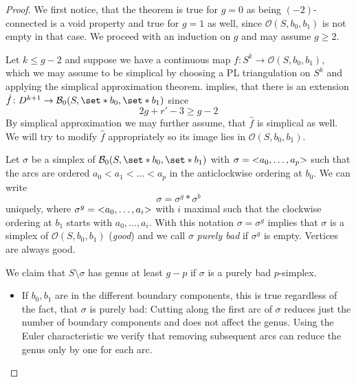 \connectivity*
\begin{proof}
	We first notice, that the theorem is true for $g=0$ as being $(-2)$-connected is a void property and true for $g=1$ as well, since $\mathcal{O}(S,b_0,b_1)$ is not empty in that case.
	We proceed with an induction on $g$ and may assume $g\ge 2$.
	
	Let $k \le g-2$ and suppose we have a continuous map $f \colon S^k \to \mathcal{O}(S,b_0,b_1)$, which we may assume to be simplical by choosing a PL triangulation on $S^k$ and applying the simplical approximation theorem.
	 implies, that there is an extension $\hat{f} \colon D^{k+1} \to \mathcal{B}_0(S,\set*{b_0},\set*{b_1})$ since 
	\[
		2g + r' -3 \ge g-2
	\]
	By simplical approximation we may further assume, that $\hat{f}$ is simplical as well.
	We will try to modify $\hat{f}$ appropriately so its image lies in $\mathcal{O}(S,b_0,b_1)$.
	
	Let $\sigma$ be a simplex of $\mathcal{B}_0(S,\set*{b_0},\set*{b_1})$ with $\sigma = \lenbrace{a_0, \ldots , a_p}$ such that the arcs are ordered $a_0 < a_1 < \ldots < a_p$ in the anticlockwise ordering at $b_0$.
	We can write 
	\[
		\sigma = \sigma^g * \sigma^b
	\]
	uniquely, where $\sigma^g = \lenbrace{a_0, \ldots ,a_i}$ with $i$ maximal such that the clockwise ordering at $b_1$ starts with $a_0, \ldots , a_i$.
	With this notation $\sigma = \sigma^g$ implies that $\sigma$ is a simplex of $\mathcal{O}(S,b_0,b_1)$ (\emph{good}) and we call $\sigma$ \emph{purely bad} if $\sigma^g$ is empty.
	Vertices are always good.
	
	We claim that $S\setminus \sigma$ has genus at least $g-p$ if $\sigma$ is a purely bad $p$-simplex.
	\begin{itemize}[itemsep=0pt]
		\item If $b_0,b_1$ are in the different boundary components, this is true regardless of the fact, that $\sigma$ is purely bad:
		Cutting along the first arc of $\sigma$ reduces just the number of boundary components and does not affect the genus.
		Using the Euler characteristic we verify that removing subsequent arcs can reduce the genus only by one for each arc. 
		

\end{itemize}
\end{proof}
